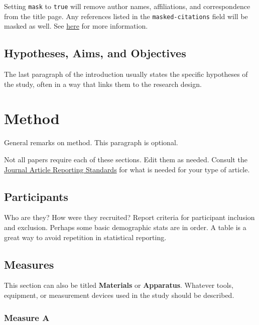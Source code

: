 \documentclass[
  jou,
  longtable,
  colorlinks=true,linkcolor=blue,citecolor=blue,urlcolor=blue]{apa7}
\begin{document}
Setting \texttt{mask} to \texttt{true} will remove author names,
affiliations, and correspondence from the title page. Any references
listed in the \texttt{masked-citations} field will be masked as well.
See
\href{https://wjschne.github.io/apaquarto/writing.html\#masked-citations-for-anonymous-peer-review}{here}
for more information.

\subsection{Hypotheses, Aims, and
Objectives}\label{hypotheses-aims-and-objectives}

The last paragraph of the introduction usually states the specific
hypotheses of the study, often in a way that links them to the research
design.

\section{Method}\label{method}

General remarks on method. This paragraph is optional.

Not all papers require each of these sections. Edit them as needed.
Consult the \href{https://apastyle.apa.org/jars}{Journal Article
Reporting Standards} for what is needed for your type of article.

\subsection{Participants}\label{participants}

Who are they? How were they recruited? Report criteria for participant
inclusion and exclusion. Perhaps some basic demographic stats are in
order. A table is a great way to avoid repetition in statistical
reporting.

\subsection{Measures}\label{measures}

This section can also be titled \textbf{Materials} or
\textbf{Apparatus}. Whatever tools, equipment, or measurement devices
used in the study should be described.

\subsubsection{Measure A}\label{measure-a}
\end{document}
